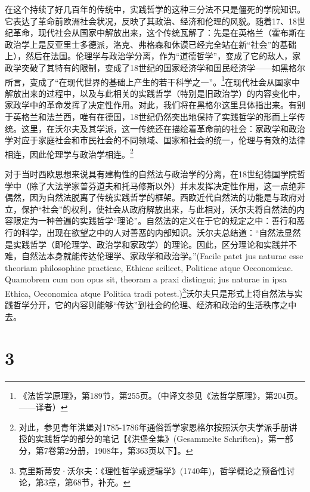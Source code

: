 在这个持续了好几百年的传统中，实践哲学的这种三分法不只是僵死的学院知识。它表达了革命前欧洲社会状况，反映了其政治、经济和伦理的风貌。随着17、18世纪革命，现代社会从国家中解放出来，这个传统瓦解了：先是在英格兰（霍布斯在政治学上是反亚里士多德派，洛克、弗格森和休谟已经完全站在新“社会”的基础上），然后在法国。伦理学与政治学分离，作为“道德哲学”，变成了它的敌人，家政学突破了其特有的限制，变成了18世纪的国家经济学和国民经济学——如黑格尔所言，变成了“在现代世界的基础上产生的若干科学之一”。\footnote{《法哲学原理》，第189节，第255页。（中译文参见《法哲学原理》，第204页。——译者）}在现代社会从国家中解放出来的过程中，以及与此相关的实践哲学（特别是旧政治学）的内容变化中，家政学中的革命发挥了决定性作用。对此，我们将在黑格尔这里具体指出来。有别于英格兰和法兰西，唯有在德国，18世纪仍然突出地保持了实践哲学的形而上学传统。这里，在沃尔夫及其学派，这一传统还在描绘着革命前的社会：家政学和政治学对应于家庭社会和市民社会的不同领域、国家和社会的统一，伦理与有效的法律相连，因此伦理学与政治学相连。\footnote{对此，参见青年洪堡对1785-1786年通俗哲学家恩格尔按照沃尔夫学派手册讲授的实践哲学的部分的笔记【《洪堡全集》(Gesammelte Schriften)，第一部分，第7卷第2分册，1908年，第363页以下】。}

对于当时西欧思想来说具有建构性的自然法与政治学的分离，在18世纪德国学院哲学中（除了大法学家普芬道夫和托马修斯以外）并未发挥决定性作用，这一点绝非偶然，因为自然法脱离了传统实践哲学的框架。西欧近代自然法的功能是与政府对立，保护“社会”的权利，使社会从政府解放出来，与此相对，沃尔夫将自然法的内容限定为一种普遍的实践哲学“理论”。自然法的定义在于它的规定之中：善行和恶行的科学，出现在欲望之中的人对善恶的内部知识。沃尔夫总结道：“自然法显然是实践哲学（即伦理学、政治学和家政学）的理论。因此，区分理论和实践并不难，自然法本身就能传达伦理学、家政学和政治学。”(Facile patet jus naturae esse theoriam philosophiae practicae, Ethicae scilicet, Politicae atque Oeconomicae. Quamobrem cum non opus sit, theoram a praxi distingui; jus naturae in ipsa Ethica, Oeconomica atque Politica tradi potest.)\footnote{克里斯蒂安·沃尔夫：《理性哲学或逻辑学》(1740年)，哲学概论之预备性讨论，第3章，第68节，补充。}沃尔夫只是形式上将自然法与实践哲学分开，它的内容则能够“传达”到社会的伦理、经济和政治的生活秩序之中去。

\section*{3}

